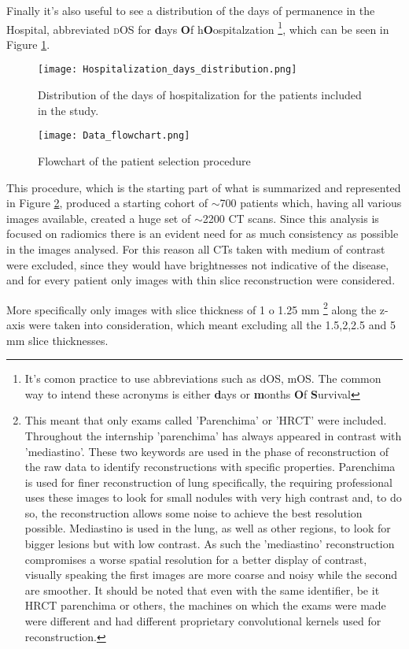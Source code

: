 Finally it's also useful to see a distribution of the days of permanence in the Hospital, abbreviated {\scshape dOS} for \textbf{d}ays \textbf{O}f h\textbf{O}ospitalzation
\footnote{It's comon practice to use abbreviations such as dOS, mOS. The common way to intend these acronyms is either \textbf{d}ays or \textbf{m}onths \textbf{O}f \textbf{S}urvival},
 which can be seen in Figure \ref{fig:dOSDistr}.

\begin{figure}[htbp]
\texttt{[image: Hospitalization\_days\_distribution.png]}
\caption{Distribution of the days of hospitalization for the patients included in the study.\label{fig:dOSDistr}}
\end{figure}

\begin{figure}[htbp]
\texttt{[image: Data\_flowchart.png]}
\caption{Flowchart of the patient selection procedure \label{fig:dataSelFlowchart}}
\end{figure}

This procedure, which is the starting part of what is summarized and represented in Figure \ref{fig:dataSelFlowchart}, produced a starting cohort of $\sim$700 patients which, having all various images available, created a huge set of $\sim$2200 CT scans. Since this analysis is focused on radiomics there is an evident need for as much consistency as possible in the images analysed. For this reason all CTs taken with medium of contrast were excluded, since they would have brightnesses not indicative of the disease, and for every patient only images with thin slice reconstruction were considered. 

More specifically only images with slice thickness of 1 o 1.25 mm
\footnote{This meant that only exams called 'Parenchima' or  'HRCT' were included. Throughout the internship 'parenchima' has always appeared in contrast with 'mediastino'. These two keywords are used in the phase of reconstruction of the raw data to identify reconstructions with specific properties. Parenchima is used for finer reconstruction of lung specifically, the requiring professional uses these images to look for small nodules with very high contrast and, to do so, the reconstruction allows some noise to achieve the best resolution possible. Mediastino is used in the lung, as well as other regions, to look for bigger lesions but with low contrast. As such the 'mediastino' reconstruction compromises a worse spatial resolution for a better display of contrast, visually speaking the first images are more coarse and noisy while the second are smoother. It should be noted that even with the same identifier, be it HRCT parenchima or others, the machines on which the exams were made were different and had different proprietary convolutional kernels used for reconstruction.} 
along the z-axis were taken into consideration, which meant excluding all the 1.5,2,2.5 and 5 mm slice thicknesses.

